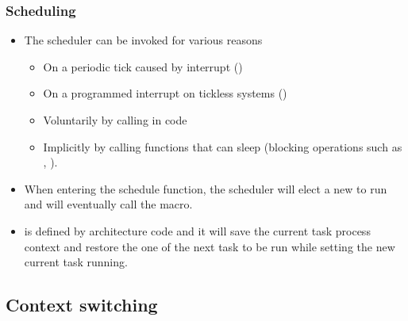 \begin{frame}[fragile]
  \frametitle{Scheduling}
  \begin{itemize}
    \item The scheduler can be invoked for various reasons
    \begin{itemize}
      \item On a periodic tick caused by interrupt ()
      \item On a programmed interrupt on tickless systems ()
      \item Voluntarily by calling  in code
      \item Implicitly by calling functions that can sleep (blocking
            operations such as , ).
    \end{itemize}
    \item When entering the schedule function, the scheduler will elect a new
           to run and will eventually call the
           macro.
    \item {} is defined by architecture code and it will save
          the current task process context and restore the one of the next task
          to be run while setting the new current task running.
  \end{itemize}
\end{frame}



\subsection{Context switching}

